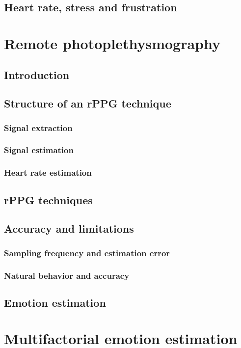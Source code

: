 \subsection{Heart rate, stress and frustration}

\section{Remote photoplethysmography}
\subsection{Introduction}
\subsection{Structure of an rPPG technique}
\subsubsection{Signal extraction}
\subsubsection{Signal estimation}
\subsubsection{Heart rate estimation}
\subsection{rPPG techniques}
\subsection{Accuracy and limitations}
\subsubsection{Sampling frequency and estimation error}
\subsubsection{Natural behavior and accuracy}
\subsection{Emotion estimation}

\section{Multifactorial emotion estimation}

